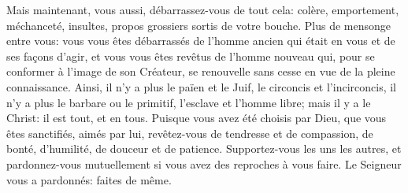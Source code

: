 Mais maintenant, vous aussi, débarrassez-vous de tout cela:
	colère, emportement, méchanceté, insultes,
	propos grossiers sortis de votre bouche.
Plus de mensonge entre vous:
	vous vous êtes débarrassés de l’homme ancien qui était en vous
		et de ses façons d’agir,
	et vous vous êtes revêtus de l’homme nouveau
	qui, pour se conformer à l’image de son Créateur,
	se renouvelle sans cesse en vue de la pleine connaissance.
Ainsi, il n’y a plus le païen et le Juif, le circoncis et l’incirconcis,
	il n’y a plus le barbare ou le primitif, l’esclave et l’homme libre;
	mais il y a le Christ: il est tout, et en tous.
Puisque vous avez été choisis par Dieu,
	que vous êtes sanctifiés, aimés par lui,
	revêtez-vous de tendresse et de compassion,
	de bonté, d’humilité, de douceur et de patience.
Supportez-vous les uns les autres,
	et pardonnez-vous mutuellement si vous avez des reproches à vous faire.
	Le Seigneur vous a pardonnés: faites de même.
